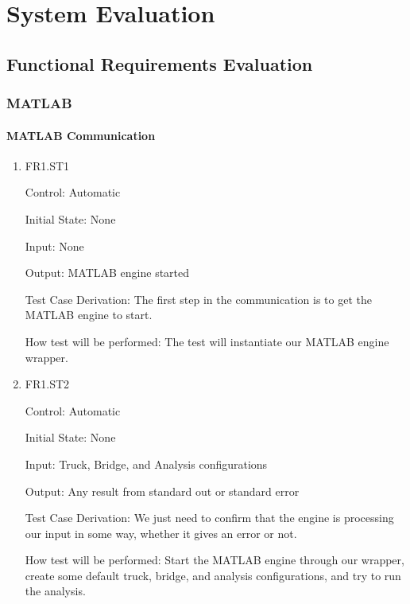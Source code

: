 \documentclass[12pt, titlepage]{article}
\begin{document}
\section{System Evaluation}

\subsection{Functional Requirements Evaluation}

\subsubsection{MATLAB}

\paragraph{MATLAB Communication}

\begin{enumerate}

  \item{FR1.ST1\\}

  Control: Automatic

  Initial State: None

  Input: None

  Output: MATLAB engine started

  Test Case Derivation: The first step in the communication is to get the MATLAB engine
  to start.

  How test will be performed: The test will instantiate our MATLAB engine wrapper.

  \item{FR1.ST2\\}

  Control: Automatic

  Initial State: None

  Input: Truck, Bridge, and Analysis configurations

  Output: Any result from standard out or standard error

  Test Case Derivation: We just need to confirm that the engine is processing our
  input in some way, whether it gives an error or not.

  How test will be performed: Start the MATLAB engine through our wrapper, create
  some default truck, bridge, and analysis configurations, and try to run the analysis.

\end{enumerate}
\end{document}

